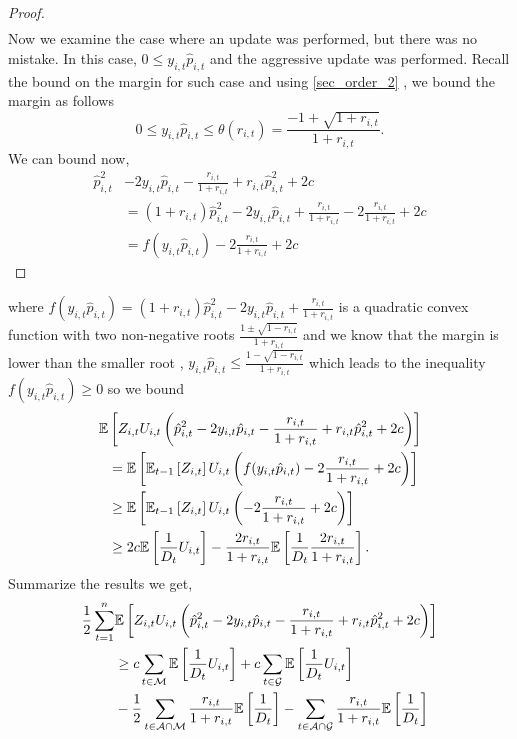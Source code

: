 \begin{proof}
\begin{equation*}
\begin{split}
\end{split}
\end{equation*}
Now we examine the case where an update was performed, but there was no mistake. In this case, $0\le y_{i,t}\hat{p}_{i,t}$ and the aggressive update was performed. Recall the bound on the margin for such case and using \eqref{sec_order_2} ,
we bound the margin as follows\begin{equation*}
0\le y_{i,t}\hat{p}_{i,t}\le \theta({r_{i,t}})=\frac{-1+\sqrt{1+r_{i,t}}}{1+r_{i,t}}.
\end{equation*}
We can bound now,
\begin{equation*}
\begin{split}
\hat{p}_{i,t}^2&-2y_{i,t}\hat{p}_{i,t}-\frac{r_{i,t}}{1+r_{i,t}}+r_{i,t}\hat{p}_{i,t}^{2}+2c\\
&=(1+r_{i,t})\hat{p}_{i,t}^2-2y_{i,t}\hat{p}_{i,t}+\frac{r_{i,t}}{1+r_{i,t}}-2\frac{r_{i,t}}{1+r_{i,t}}+2c\\
&=f(y_{i,t}\hat{p}_{i,t})-2\frac{r_{i,t}}{1+r_{i,t}}+2c
\end{split}
\end{equation*}
\end{proof}          
where $f(y_{i,t}\hat{p}_{i,t})=(1+r_{i,t})\hat{p}_{i,t}^2-2y_{i,t}\hat{p}_{i,t}+\frac{r_{i,t}}{1+r_{i,t}}$ is a quadratic convex function with two non-negative roots $\frac{1\pm\sqrt{1-r_{i,t}}}{1+r_{i,t}}$ and we know that the margin is lower than the smaller root , $y_{i,t}\hat{p}_{i,t}\le\frac{1-\sqrt{1-r_{i,t}}}{1+r_{i,t}}$ which leads to the inequality $f(y_{i,t}\hat{p}_{i,t})\ge0$ so we bound 
\begin{equation*}
\begin{split}
\mathbb{E}&\left[{Z_{i,t}U_{i,t}\left({\hat{p}_{i,t}^2-2y_{i,t}\hat{p}_{i,t}-\frac{r_{i,t}}{1+r_{i,t}}+r_{i,t}\hat{p}_{i,t}^{2}+2c}\right)}\right]\\
&=\mathbb{E}\left[{\mathbb{E}_{t-1}\left[{Z_{i,t}}\right]U_{i,t}\left({f(y_{i,t}\hat{p}_{i,t})-2\frac{r_{i,t}}{1+r_{i,t}}+2c}\right)}\right]\\
&\ge\mathbb{E}\left[{\mathbb{E}_{t-1}\left[{Z_{i,t}}\right]U_{i,t}\left({-2\frac{r_{i,t}}{1+r_{i,t}}+2c}\right)}\right]\\
&\ge 2c\mathbb{E}\left[{\frac{1}{D_t}U_{i,t}}\right]-\frac{2r_{i,t}}{1+r_{i,t}}\mathbb{E}\left[{\frac{1}{D_t}\frac{2r_{i,t}}{1+r_{i,t}}}\right].
\end{split}
\end{equation*}
Summarize the results we get,
\begin{equation}
\begin{split}
\frac{1}{2} \sum_{t=1}^{n}&\mathbb{E}\left[{Z_{i,t}U_{i,t}\left({\hat{p}_{i,t}^2-2y_{i,t}\hat{p}_{i,t}-\frac{r_{i,t}}{1+r_{i,t}}+r_{i,t}\hat{p}_{i,t}^{2}+2c}\right)}\right]\\
&\ge c \sum_{t\in\mathcal{M}}\mathbb{E}\left[{\frac{1}{D_t}U_{i,t}}\right]+c \sum_{t\in\mathcal{G}}\mathbb{E}\left[{\frac{1}{D_t}U_{i,t}}\right]\\
&-\frac{1}{2}\sum_{t\in\mathcal{A\cap M}}\frac{r_{i,t}}{1+r_{i,t}}\mathbb{E}\left[{\frac{1}{D_t}}\right]
-\sum_{t\in\mathcal{A\cap G}}\frac{r_{i,t}}{1+r_{i,t}}\mathbb{E}\left[{\frac{1}{D_t}}\right]
\end{split}
\end{equation}

